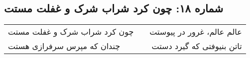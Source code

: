 \begin{center}
\section*{شماره ۱۸: چون کرد شراب شرک و غفلت مستت}
\label{sec:018}
\begin{longtable}{l p{0.5cm} r}
چون کرد شراب شرک و غفلت مستت
&&
عالم عالم، غرور در پیوستت
\\
چندان که مپرس سرفرازی هستت
&&
تاتن بنیوفتی که گیرد دستت
\\
\end{longtable}
\end{center}
